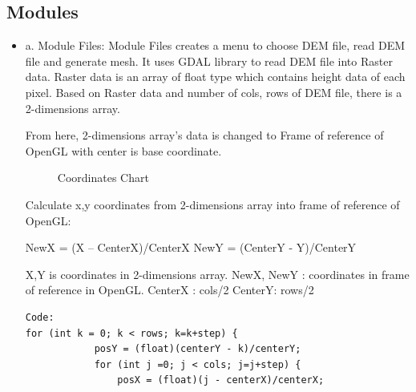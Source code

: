 \documentclass[11pt]{article}
\begin{document}
\subsection{Modules} 
\begin{itemize}
\item a. Module Files:
Module Files creates a menu to choose DEM file, read DEM file and generate mesh.
It uses GDAL library to read DEM file into Raster data.
Raster data is an array of float type which contains height data of each pixel. Based on Raster data and number of cols, rows of DEM file, there is a 2-dimensions array.

From here, 2-dimensions array's data is changed to Frame of reference of OpenGL with center is base coordinate.
\begin{figure}[H] 
  \caption {Coordinates Chart} 
\end{figure} 
Calculate x,y coordinates from 2-dimensions array into frame of reference of OpenGL:

NewX = (X – CenterX)/CenterX
NewY = (CenterY - Y)/CenterY

X,Y is coordinates in 2-dimensions array.
NewX, NewY : coordinates in frame of reference in OpenGL.
CenterX : cols/2
CenterY: rows/2

\begin{lstlisting}
Code: 
for (int k = 0; k < rows; k=k+step) {
            posY = (float)(centerY - k)/centerY;
            for (int j =0; j < cols; j=j+step) {
                posX = (float)(j - centerX)/centerX;
\end{lstlisting}


\end{itemize}
\end{document}
